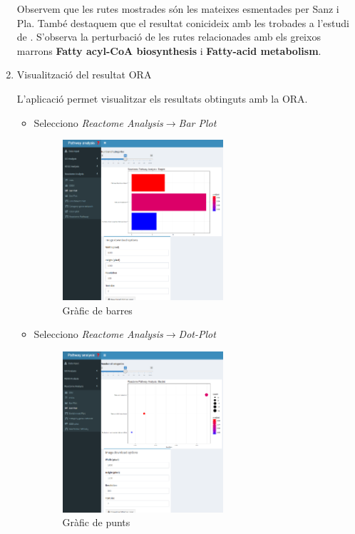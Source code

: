 \begin{enumerate}
Observem que les rutes mostrades són les mateixes esmentades per Sanz i Pla. També destaquem que el resultat conicideix amb les trobades a l’estudi de \cite{li2017zbtb7b}. S'observa la perturbació de les rutes relacionades amb els greixos marrons \textbf{Fatty acyl-CoA biosynthesis} i \textbf{Fatty-acid metabolism}.

\item Visualització del resultat \gls{ORA}

L'aplicació permet visualitzar els resultats obtinguts amb la \gls{ORA}. 

\begin{itemize}
\item Selecciono \textit{Reactome Analysis}$\rightarrow$\textit{Bar Plot}

\begin{figure}[H]
\centering
\includegraphics[width=0.6\textwidth]{figures/Estudi1_Fig4_ORA_BP_RA.png} 
\caption{Gràfic de barres}
\end{figure}

\item Selecciono \textit{Reactome Analysis}$\rightarrow$\textit{\gls{Dot-Plot}}

\begin{figure}[H]
\centering
\includegraphics[width=0.6\textwidth]{figures/Estudi1_Fig5_ORA_Dot_RA.png} 
\caption{Gràfic de punts}
\end{figure}


\end{itemize}
\end{enumerate}
